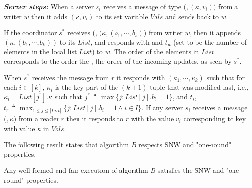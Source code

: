 \textit{\textbf{Server steps:}}  
When a server $s_i$ receives a message of type $(${\writeValueTag}$, ({\kappa}, v_{i}))$ from a writer $w$ then 
it  adds $({\kappa}, v_i)$ to its set variable  
$Vals$ and sends {\ackTag} back to $w$.

If the coordinator $s^*$ receives  (\updateCoordTag, $({\kappa}, (b_{1}, \cdots, b_{k})$) from writer $w$, then it appends  
			 $({\kappa}, (b_{1}, \cdots, b_{k}))$ to its  $List$,  and responds with  
			 {\ackTag} and $t_{w}$ (set to be the number of elements in the local list $List$)  to $w$.
			 The order of the  elements in  $List$ corresponds to  the order  
the \wots{}, the order of the incoming  {\updateCoordTag} updates,  as seen by $s^*$.
	
When $s^*$  receives  the message  {\getTagArrayTag} from $r$  it responds with 
$(\kappa_1, \cdots, \kappa_k)$ such that for each $i \in [k]$, $\kappa_i$ is the key  part of the $(k+1)$-tuple that was modified
last, i.e., 	${\kappa}_i = List[j^*].{\kappa}$ such that 	 $j^* \triangleq\max \{ j : List[j].b_i =1 \}$, and 
$t_r$, $t_r \triangleq \max_{1 \leq j \leq |List|} \{ j : List[j].b_i = 1 \wedge i \in I\}$.
%
  	If any server $s_i$ receives a message  $(${\readValueTag}$, {\kappa})$ from a reader $r$ then it responds to $r$ with 
   the value $v_i$ corresponding to key with value  $\kappa$ in  $Vals$. 

The following result states that algorithm $B$ respects SNW and "one-round" properties.

\begin{theorem} Any well-formed  and fair execution of algorithm $B$  satisfies the SNW and "one-round"  properties. %
\end{theorem}

